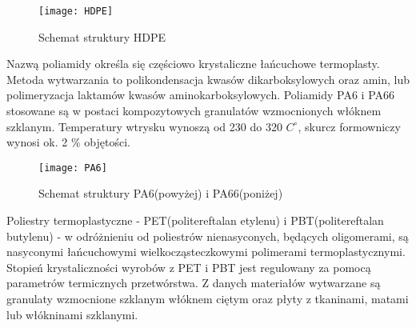 \documentclass[magister,druk]{dyplom}
\begin{document}
\begin{figure}[H]
	\centering
	\texttt{[image: HDPE]}
	\caption{Schemat struktury HDPE\cite{wiki}}
\end{figure}

Nazwą poliamidy określa się częściowo krystaliczne łańcuchowe termoplasty. Metoda wytwarzania to polikondensacja kwasów dikarboksylowych oraz amin, lub polimeryzacja laktamów kwasów aminokarboksylowych. Poliamidy PA6 i PA66 stosowane są w postaci kompozytowych granulatów wzmocnionych włóknem szklanym. Temperatury wtrysku wynoszą od 230 do 320 ${C^{\circ}}$, skurcz formowniczy wynosi ok. 2 \% objętości.

\begin{figure}[H]
	\centering
	\texttt{[image: PA6]}
	\caption{Schemat struktury PA6(powyżej) i PA66(poniżej)\cite{wikiPA}}
\end{figure}

Poliestry termoplastyczne - PET(politereftalan etylenu) i PBT(politereftalan butylenu) - w odróżnieniu od poliestrów nienasyconych, będących oligomerami, są nasyconymi łańcuchowymi wielkocząsteczkowymi polimerami termoplastycznymi. Stopień krystaliczności wyrobów z PET i PBT jest regulowany za pomocą parametrów termicznych przetwórstwa. Z danych materiałów wytwarzane są granulaty wzmocnione szklanym włóknem ciętym oraz płyty z tkaninami, matami lub włókninami szklanymi.
\end{document}
